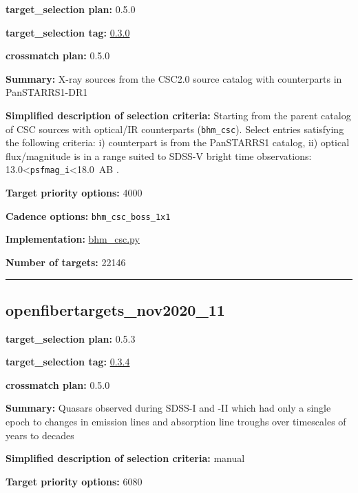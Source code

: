 \noindent\textbf{target\_selection plan:} 0.5.0

\noindent\textbf{target\_selection tag:}
\href{https://github.com/sdss/target_selection/tree/0.3.0/}{0.3.0}

\noindent\textbf{crossmatch plan:} 0.5.0

\noindent\textbf{Summary:} X-ray sources from the CSC2.0 source catalog with
counterparts in PanSTARRS1-DR1

\noindent\textbf{Simplified description of selection criteria:} Starting from the
parent catalog of CSC sources with optical/IR counterparts
(\texttt{bhm\_csc}). Select entries satisfying the following criteria:
i) counterpart is from the PanSTARRS1 catalog, ii) optical
flux/magnitude is in a range suited to SDSS-V bright time observations:
13.0\textless{}\texttt{psfmag\_i}\textless18.0~AB .


\noindent\textbf{Target priority options:} 4000

\noindent\textbf{Cadence options:} \texttt{bhm\_csc\_boss\_1x1}

\noindent\textbf{Implementation:}
\href{https://github.com/sdss/target_selection/blob/0.3.0/python/target_selection/cartons/bhm_csc.py}{bhm\_csc.py}

\noindent\textbf{Number of targets:} 22146

\begin{center}\rule{0.5\linewidth}{0.5pt}\end{center}

\hypertarget{openfibertargets_nov2020_11_plan0.5.3}{%
\subsection{openfibertargets\_nov2020\_11}\label{openfibertargets_nov2020_11_plan0.5.3}}

\noindent\textbf{target\_selection plan:} 0.5.3

\noindent\textbf{target\_selection tag:}
\href{https://github.com/sdss/target_selection/tree/0.3.4/}{0.3.4}

\noindent\textbf{crossmatch plan:} 0.5.0

\noindent\textbf{Summary:} Quasars observed during SDSS-I and -II which had only
a single epoch to changes in emission lines and absorption line troughs
over timescales of years to decades

\noindent\textbf{Simplified description of selection criteria:} manual


\noindent\textbf{Target priority options:} 6080

